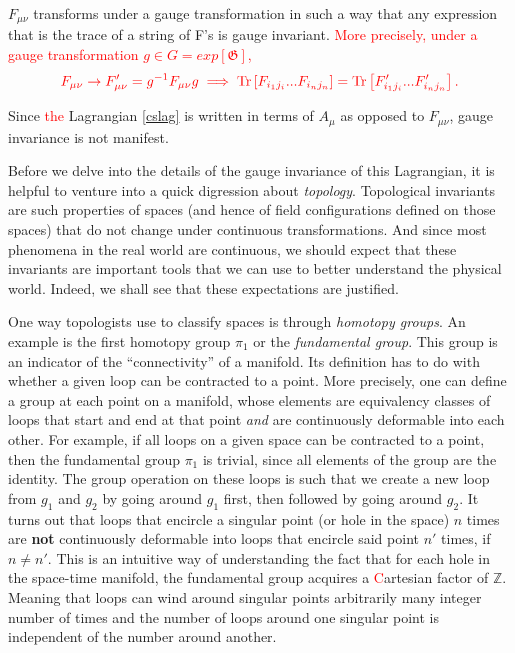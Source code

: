     $F_{\mu \nu}$ transforms under a gauge transformation in such a way that any expression that is the trace of a string of F's is gauge invariant. \textcolor{red}{More precisely, under a gauge transformation $g\in G=exp\left[\mathfrak{G} \right]$, }
\begin{align}
    \textcolor{red}{F_{\mu \nu} \rightarrow F'_{\mu\nu} = g^{-1} F_{\mu \nu} g \implies \mathrm{Tr}\left[ F_{i_1 j_i} ...F_{i_n j_n} \right]= \mathrm{Tr} \left[F'_{i_1 j_i} ...F'_{i_n j_n} \right].}
\end{align}

    Since \textcolor{red}{the} Lagrangian \textcolor{red}{\eqref{cslag}} is written in terms of $A_{\mu}$ as opposed to $F_{\mu \nu}$, gauge invariance is not manifest.


    Before we delve into the details of the gauge invariance of this Lagrangian, it is helpful to venture into a quick digression about \textit{topology}. Topological invariants are such properties of spaces (and hence of field configurations defined on those spaces) that do not change under continuous transformations. And since most phenomena in the real world are continuous, we should expect that these invariants are important tools that we can use to better understand the physical world. Indeed, we shall see that these expectations are justified. 

    One way topologists use to classify spaces is through \textit{homotopy groups}. An example is the first homotopy group $\pi_1$ or the \textit{fundamental group}. This group is an indicator of the ``connectivity'' of a manifold. Its definition has to do with whether a given loop can be contracted to a point. More precisely, one can define a group at each point on a manifold, whose elements are equivalency classes of loops that start and end at that point \textit{and} are continuously deformable into each other. For example, if all loops on a given space can be contracted to a point, then the fundamental group $\pi_1$ is trivial, since all elements of the group are the identity. The group operation on these loops is such that we create a new loop from $g_1$ and $g_2$ by going around $g_1$ first, then followed by going around $g_2$. It turns out that loops that encircle a singular point (or hole in the space) $n$ times are \textbf{not} continuously deformable into loops that encircle said point $n'$ times, if $n \neq n'$. This is an intuitive way of understanding the fact that for each hole in the space-time manifold, the fundamental group acquires a \textcolor{red}{C}artesian factor of $\mathbb{Z}$. Meaning that loops can wind around singular points arbitrarily many integer number of times and the number of loops around one singular point is independent of the number around another.

